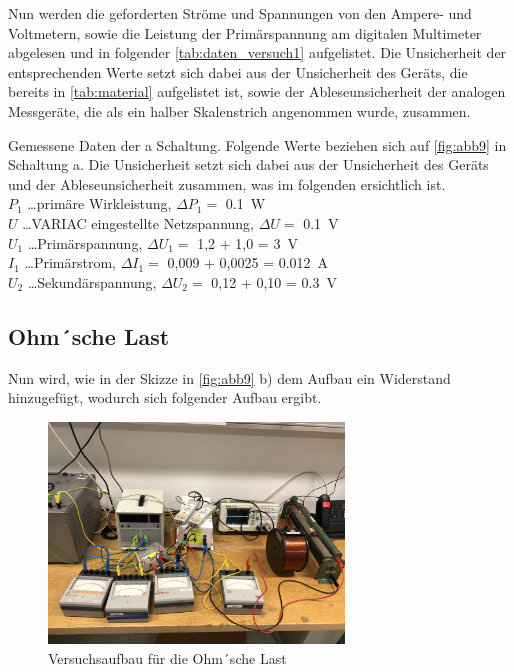 \documentclass[11pt,ngerman]{scrartcl}
\begin{document}
Nun werden die geforderten Ströme und Spannungen von den Ampere- und
Voltmetern, sowie die Leistung der Primärspannung am digitalen Multimeter
abgelesen und in folgender \autoref{tab:daten_versuch1} aufgelistet. Die
Unsicherheit der entsprechenden Werte setzt sich dabei aus der Unsicherheit des
Geräts, die bereits in \autoref{tab:material} aufgelistet ist, sowie der
Ableseunsicherheit der analogen Messgeräte, die als ein halber Skalenstrich
angenommen wurde, zusammen.


\begin{table}[H]
	\caption{Gemessene Daten der a Schaltung. Folgende Werte beziehen sich auf
		\autoref{fig:abb9} in Schaltung a. Die Unsicherheit setzt sich dabei aus
		der Unsicherheit des Geräts und der Ableseunsicherheit zusammen, was im
		folgenden ersichtlich ist.\\
		$P_1$ \dots primäre Wirkleistung, $\Delta P_1 =$ \SI{0.1}{W} \\
		$U$ \dots VARIAC eingestellte Netzspannung, $\Delta U =$ \SI{0.1}{V}\\
		$U_1$ \dots  Primärspannung, $\Delta U_1 =$ 1,2 + 1,0 = \SI{3}{V} \\
		$I_1$ \dots Primärstrom, $\Delta I_1 =$ 0,009 + 0,0025 = \SI{0.012}{A} \\
		$U_2$ \dots Sekundärspannung, $\Delta U_2 =$ 0,12 + 0,10 = \SI{0.3}{V}  \\
	}
	\label{tab:daten_versuch1}
	\begin{center}
		
	\end{center}
\end{table}



\subsection{Ohm´sche Last}

Nun wird, wie in der Skizze in \autoref{fig:abb9} b) dem Aufbau ein Widerstand hinzugefügt, wodurch sich folgender Aufbau ergibt.

\begin{figure}[H]
	\begin{center}
		\includegraphics[width=0.7\textwidth]{widerstand}
	\end{center}
	\caption{Versuchsaufbau für die Ohm´sche Last}
	\label{fig:widerstand}
\end{figure}
\end{document}
